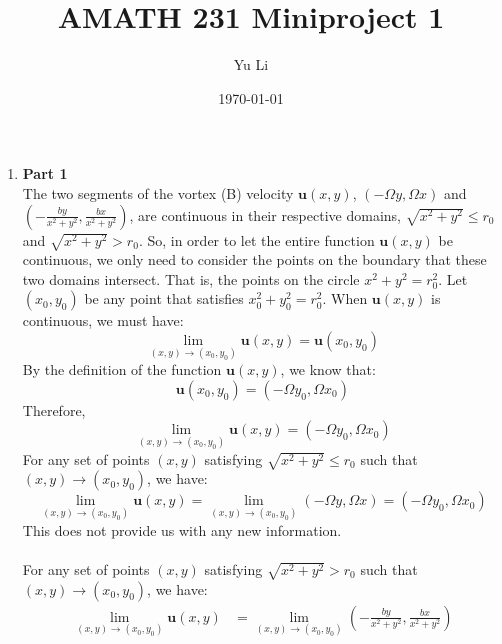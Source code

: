 \documentclass{article}
\title{AMATH 231 Miniproject 1}
\author{Yu Li}
\date{\today}
\begin{document}
\maketitle




\begin{enumerate}

\item \textbf{Part 1}\\
The two segments of the vortex (B) velocity \(\mathbf{u}(x,y)\), \((-\Omega y, \Omega x)\) and \((-\frac{by}{x^2+y^2}, \frac{bx}{x^2+y^2})\),
are continuous in their respective domains, \(\sqrt{x^2+y^2}\le r_0\) and \(\sqrt{x^2+y^2}> r_0\).
So, in order to let the entire function \(\mathbf{u}(x,y)\) be continuous, we only need to consider the points
on the boundary that these two domains intersect. That is, the points on the circle \(x^2+y^2=r_0^2\).
Let \((x_0,y_0)\) be any point that satisfies \(x_0^2+y_0^2 = r_0^2\).
When \(\mathbf{u}(x,y)\) is continuous, we must have:
\begin{equation}
  \lim_{(x,y)\to (x_0,y_0)} \mathbf{u}(x,y) = \mathbf{u}(x_0,y_0)
\end{equation}
By the definition of the function \(\mathbf{u}(x,y)\), we know that:
\begin{equation}
  \mathbf{u}(x_0,y_0) = (-\Omega y_0, \Omega x_0)
\end{equation}
Therefore,
\begin{equation}
  \lim_{(x,y)\to (x_0,y_0)} \mathbf{u}(x,y) = (-\Omega y_0, \Omega x_0)
\end{equation}
For any set of points \((x,y)\) satisfying \(\sqrt{x^2+y^2}\le r_0\) such that \((x,y)\to (x_0,y_0)\), we have:
\begin{equation}
  \lim_{(x,y)\to (x_0,y_0)} \mathbf{u}(x,y) = \lim_{(x,y)\to (x_0,y_0)} (-\Omega y, \Omega x) = (-\Omega y_0, \Omega x_0)
\end{equation}
This does not provide us with any new information.\\
\\
For any set of points \((x,y)\) satisfying \(\sqrt{x^2+y^2}> r_0\) such that \((x,y)\to (x_0,y_0)\), we have:
\begin{align*}
  \lim_{(x,y)\to (x_0,y_0)} \mathbf{u}(x,y)
  &= \lim_{(x,y)\to (x_0,y_0)} \left(-\frac{by}{x^2+y^2}, \frac{bx}{x^2+y^2}\right)\\

\end{align*}
\end{enumerate}
\end{document}

